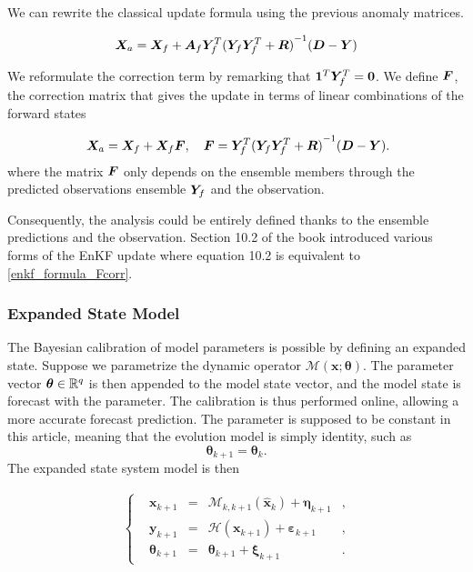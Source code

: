 We can rewrite the classical update formula using the previous anomaly matrices.

\begin{equation*}
    \bm{X}_a = \bm{X}_f + \bm A_f \bm Y_f^T {({\bm Y_f \bm Y_f^T + \bm R})}^{-1}(\bm{D} - \bm{Y})
\end{equation*}

We reformulate the correction term by remarking that $ \bm{1}^T  \bm Y_f^T = \bm{0}$. We define $\bm{F}$, the correction matrix that gives the update in terms of linear combinations of the forward states

\begin{equation}~\label{enkf_formula_Fcorr}
    \bm{X}_a = \bm{X}_f + \bm{X}_f \bm{F}, \quad \bm{F} = \bm Y_f^T {(\bm Y_f \bm Y_f^T + \bm R)}^{-1}(\bm{D} - \bm{Y}).
\end{equation}where the matrix $\bm{F}$ only depends on the ensemble members through the predicted observations ensemble $\bm{Y}_f$ and the observation.

Consequently, the analysis could be entirely defined thanks to the ensemble predictions and the observation. Section 10.2 of the book \cite{evensen_data_2022} introduced various forms of the EnKF update where equation 10.2 is equivalent to \ref{enkf_formula_Fcorr}.

\subsubsection{Expanded State Model} \label{ExpandedState}

The Bayesian calibration of model parameters is possible by defining an expanded state. Suppose we parametrize the dynamic operator $\mathcal{M}(\bm{x} ; \bm{\theta})$. The parameter vector $\bm{\theta} \in \mathbb{R}^q$ is then appended to the model state vector, and the model state is forecast with the parameter. The calibration is thus performed online, allowing a more accurate forecast prediction.
The parameter is supposed to be constant in this article, meaning that the evolution model is simply identity, such as
\begin{equation*}
    \bm{\theta}_{k+1} = \bm{\theta}_{k}.
\end{equation*}
The expanded state system model is then

\begin{gather*}
    \left\{\begin{aligned}
         & \bm{x}_{k+1}      & = & \mathcal{M}_{k, k+1}(\hat{\bm{x}}_{k}) + \bm{\eta}_{k+1} & , \\
         & \bm{y}_{k+1}      & = & \mathcal{H}(\bm{x}_{k+1}) + \bm{\varepsilon}_{k+1}       & , \\
         & \bm{\theta}_{k+1} & = & \bm{\theta}_{k+1} + \bm{\xi}_{k+1}                       & .
    \end{aligned} \right.
\end{gather*}

